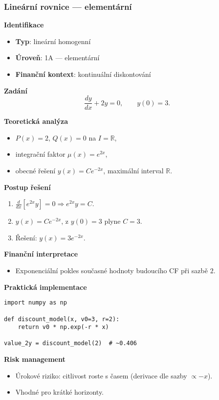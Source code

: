 \subsubsection{Lineární rovnice — elementární}
\label{subsec:1a-linearne}

\begin{example}
\label{ex:1a3}

\textbf{Identifikace}
\begin{itemize}
\item \textbf{Typ}: lineární homogenní
\item \textbf{Úroveň}: 1A — elementární
\item \textbf{Finanční kontext}: kontinuální diskontování
\end{itemize}

\textbf{Zadání}
\[
\frac{dy}{dx} + 2y = 0, \qquad y(0)=3.
\]

\textbf{Teoretická analýza}
\begin{itemize}
\item $P(x)=2$, $Q(x)=0$ na $I=\mathbb{R}$,
\item integrační faktor $\mu(x)=e^{2x}$,
\item obecné řešení $y(x)=C e^{-2x}$, maximální interval $\mathbb{R}$.
\end{itemize}

\textbf{Postup řešení}
\begin{enumerate}
\item $\frac{d}{dx}[e^{2x}y] = 0 \Rightarrow e^{2x}y=C$.
\item $y(x)=C e^{-2x}$, z $y(0)=3$ plyne $C=3$.
\item Řešení: $y(x)=3e^{-2x}$.
\end{enumerate}

\textbf{Finanční interpretace}
\begin{itemize}
\item Exponenciální pokles současné hodnoty budoucího CF při sazbě $2$.
\end{itemize}

\textbf{Praktická implementace}
\begin{verbatim}
import numpy as np

def discount_model(x, v0=3, r=2):
    return v0 * np.exp(-r * x)

value_2y = discount_model(2)  # ~0.406
\end{verbatim}

\textbf{Risk management}
\begin{itemize}
\item Úrokové riziko: citlivost roste s časem (derivace dle sazby $\propto -x$).
\item Vhodné pro krátké horizonty.
\end{itemize}
\end{example}

